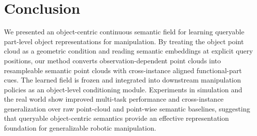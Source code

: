 \section{Conclusion}
We presented an object-centric continuous semantic field for learning queryable part-level object representations for manipulation. By treating the object point cloud as a geometric condition and reading semantic embeddings at explicit query positions, our method converts observation-dependent point clouds into resampleable semantic point clouds with cross-instance aligned functional-part cues. The learned field is frozen and integrated into downstream manipulation policies as an object-level conditioning module. Experiments in simulation and the real world show improved multi-task performance and cross-instance generalization over raw point-cloud and point-wise semantic baselines, suggesting that queryable object-centric semantics provide an effective representation foundation for generalizable robotic manipulation.

